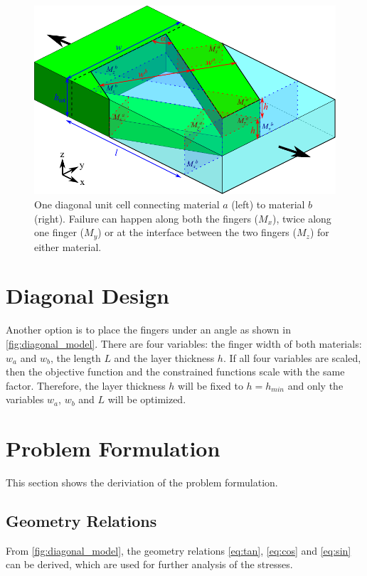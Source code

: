 
\begin{figure}[H]
	\centering
	\includegraphics[width=\columnwidth]{sources/method/diagonal_model_v3.pdf}
	\caption{
		One diagonal unit cell connecting material $a$ (left) to material $b$ (right).
		Failure can happen along both the fingers ($M_x$), twice along one finger ($M_y$) or at the interface between the two fingers ($M_z$) for either material.}
	\label{fig:diagonal_model}
\end{figure}



\section{Diagonal Design}

Another option is to place the fingers under an angle as shown in \autoref{fig:diagonal_model}.
There are four variables: the finger width of both materials: $w_a$ and $w_b$, the length $L$ and the layer thickness $h$. If all four variables are scaled, then the objective function and the constrained functions scale with the same factor. Therefore, the layer thickness $h$ will be fixed to $h = h_{min}$ and only the variables $w_a$, $w_b$ and $L$ will be optimized.

\section{Problem Formulation}
This section shows the deriviation of the problem formulation.

\subsection{Geometry Relations}
From \autoref{fig:diagonal_model}, the geometry relations \ref{eq:tan}, \ref{eq:cos} and \ref{eq:sin} can be derived, which are used for further analysis of the stresses.

